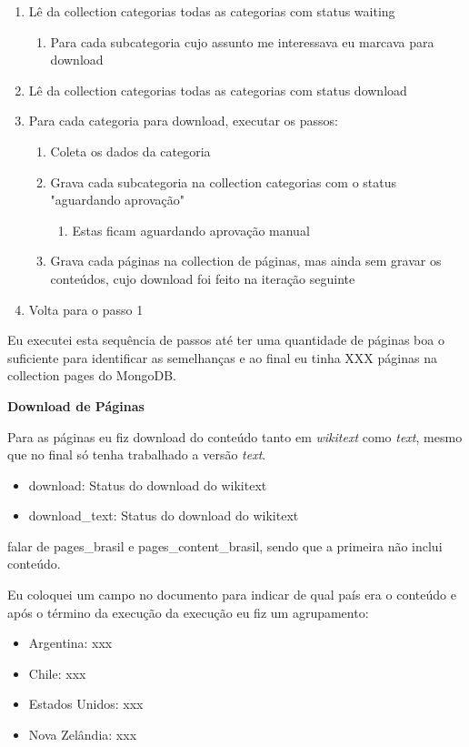 \begin{enumerate}
    \item Lê da collection categorias todas as categorias com status waiting
    \begin{enumerate}
        \item Para cada subcategoria cujo assunto me interessava eu marcava para download
    \end{enumerate}
    \item Lê da collection categorias todas as categorias com status download
    \item Para cada categoria para download, executar os passos: 
    \begin{enumerate}
        \item Coleta os dados da categoria
        \item Grava cada subcategoria na collection categorias com o status "aguardando aprovação"
        \begin{enumerate}
            \item Estas ficam aguardando aprovação manual
        \end{enumerate}
        \item Grava cada páginas na collection de páginas, mas ainda sem gravar os conteúdos, cujo download foi feito na iteração seguinte
    \end{enumerate}
    \item Volta para o passo 1
\end{enumerate}

Eu executei esta sequência de passos até ter uma quantidade de páginas boa o suficiente para identificar as semelhanças e ao final eu tinha XXX páginas na collection pages do MongoDB.

\textbf{Download de Páginas}

Para as páginas eu fiz download do conteúdo tanto em \textit{wikitext} como \textit{text}, mesmo que no final só tenha trabalhado a versão \textit{text}.

\begin{itemize}
    \item download: Status do download do wikitext
    \item download_text: Status do download do wikitext
\end{itemize}

falar de pages_brasil e pages_content_brasil, sendo que a primeira não inclui conteúdo.

Eu coloquei um campo no documento para indicar de qual país era o conteúdo e após o término da execução da execução eu fiz um agrupamento:
\begin{itemize}
    \item Argentina: xxx
    \item Chile: xxx
    \item Estados Unidos: xxx
    \item Nova Zelândia: xxx
\end{itemize}

